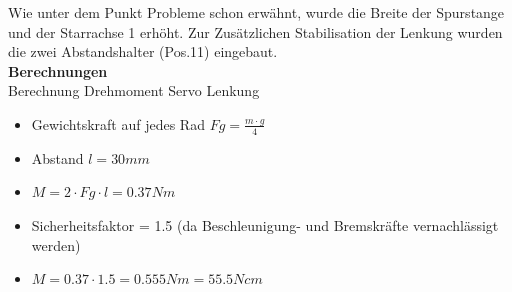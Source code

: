 Wie unter dem Punkt Probleme schon erwähnt, wurde die Breite der Spurstange und der Starrachse 1 erhöht. Zur Zusätzlichen Stabilisation der Lenkung wurden die zwei Abstandshalter (Pos.11) eingebaut.\\[0.2cm]
\textbf{Berechnungen}\\[0.2cm]
Berechnung Drehmoment Servo Lenkung
\begin{itemize}
\item Gewichtskraft auf jedes Rad $Fg = \frac{m\cdot g}{4}$
\item Abstand $l = 30mm$
\item $M = 2\cdot Fg\cdot l = 0.37Nm$
\item Sicherheitsfaktor = 1.5 (da Beschleunigung- und Bremskräfte vernachlässigt werden)
\item $M = 0.37\cdot 1.5 = 0.555Nm = 55.5Ncm$
\end{itemize}